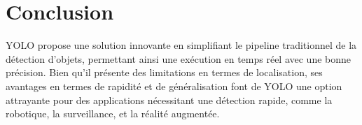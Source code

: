 \documentclass[a4paper,11pt]{article}
\begin{document}
\section{Conclusion}

\indent YOLO propose une solution innovante en simplifiant le pipeline traditionnel de la détection d’objets, permettant ainsi une exécution en temps réel avec une bonne précision. Bien qu’il présente des limitations en termes de localisation, ses avantages en termes de rapidité et de généralisation font de YOLO une option attrayante pour des applications nécessitant une détection rapide, comme la robotique, la surveillance, et la réalité augmentée.
\end{document}
